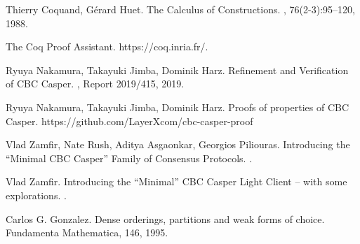 \documentclass[runningheads]{llncs}
\begin{document}
\begin{thebibliography}{99}

 Thierry Coquand, Gérard Huet.
\newblock The Calculus of Constructions.
, 76(2-3):95--120, 1988.

\newblock The Coq Proof Assistant.
\newblock https://coq.inria.fr/.

 Ryuya Nakamura, Takayuki Jimba, Dominik Harz.
\newblock Refinement and Verification of CBC Casper.
, Report 2019/415, 2019.

 Ryuya Nakamura, Takayuki Jimba, Dominik Harz.
\newblock Proofs of properties of CBC Casper.
\newblock https://github.com/LayerXcom/cbc-casper-proof

 Vlad Zamfir, Nate Rush, Aditya Asgaonkar, Georgios Piliouras.
\newblock Introducing the ``Minimal CBC Casper'' Family of Consensus Protocols.
.

 Vlad Zamfir.
\newblock Introducing the ``Minimal'' CBC Casper Light Client -- with some explorations.
.

 Carlos G. Gonzalez.
\newblock Dense orderings, partitions and weak forms of choice.
\newblock Fundamenta Mathematica, 146, 1995.

\end{thebibliography}




\end{document}
